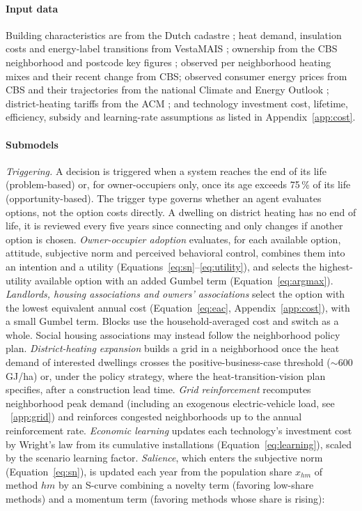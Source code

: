\documentclass[preprint,12pt,authoryear]{elsarticle}
\begin{document}
\paragraph{Input data}
Building characteristics are from the Dutch cadastre
\citep{kadasterDatasetBasisregistratieAdressen2022}; heat demand, insulation
costs and energy-label transitions from VestaMAIS \citep{pblHetVestaMAIS2017,
vandermolenFunctioneelOntwerpVesta2021}; ownership from the CBS neighborhood
and postcode key figures \citep{cbsKerncijfersWijkenBuurten2023,
cbsKerncijfersPostcode2023}; observed per neighborhood heating mixes and
their recent change from CBS; observed consumer energy prices from CBS
\citep{StatLineGemiddeldeEnergietarievena} and their trajectories from the national
Climate and Energy Outlook \citep{pbl_kev_2025}; district-heating tariffs
from the ACM \citep{marktTarievenWarmteKoude}; and technology investment
cost, lifetime, efficiency, subsidy and learning-rate assumptions as listed
in Appendix~\ref{app:cost}.

\paragraph{Submodels}
\emph{Triggering.} A decision is triggered when a system reaches the end of
its life (problem-based) or, for owner-occupiers only, once its age
exceeds 75\,\% of its life (opportunity-based). The trigger type governs
whether an agent evaluates options, not the option costs directly. A dwelling
on district heating has no end of life, it is reviewed every five years since
connecting and only changes if another option is chosen.
\emph{Owner-occupier adoption} evaluates, for each available option,
attitude, subjective norm and perceived behavioral
control, combines them into an intention and a utility
(Equations~\ref{eq:sn}--\ref{eq:utility}), and selects the highest-utility
available option with an added Gumbel term (Equation~\ref{eq:argmax}).
\emph{Landlords, housing associations and owners' associations} select the
option with the lowest equivalent annual cost (Equation~\ref{eq:eac},
Appendix~\ref{app:cost}), with a small Gumbel term. Blocks use the
household-averaged cost and switch as a whole. Social housing associations
may instead follow the neighborhood policy plan.
\emph{District-heating expansion} builds a grid in a neighborhood once the
heat demand of interested dwellings crosses the positive-business-case
threshold ($\sim$600\,GJ/ha) or, under the policy strategy, where the
heat-transition-vision plan specifies, after a construction lead time.
\emph{Grid reinforcement} recomputes neighborhood peak demand (including an
exogenous electric-vehicle load, see ~\ref{app:grid}) and reinforces congested neighborhoods up to
the annual reinforcement rate. \emph{Economic learning} updates each
technology's investment cost by Wright's law from its cumulative
installations (Equation~\ref{eq:learning}), scaled by the scenario learning
factor. \emph{Salience}, which enters the subjective norm
(Equation~\ref{eq:sn}), is updated each year from the population share
$x_{hm}$ of method $hm$ by an S-curve combining a novelty term (favoring
low-share methods) and a momentum term (favoring methods whose share is
rising):
\end{document}
